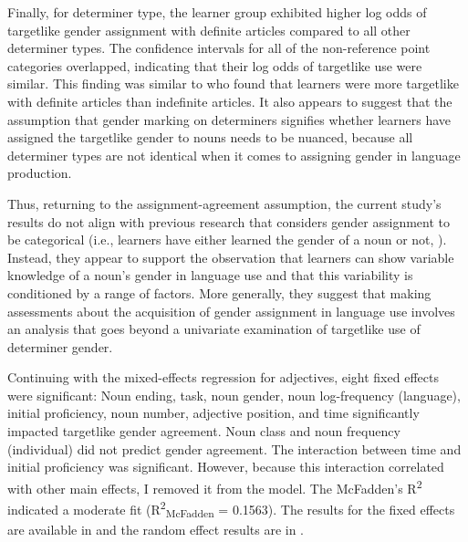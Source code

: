 \documentclass[output=paper,colorlinks,citecolor=brown,modfonts,nonflat]{../langscibook}
\begin{document}
Finally, for determiner type, the learner group exhibited higher log odds of targetlike gender assignment with definite articles compared to all other determiner types. The confidence intervals for all of the non-reference point categories overlapped, indicating that their log odds of targetlike use were similar. This finding was similar to \citet{GaravitoWhite2002} who found that learners were more targetlike with definite articles than indefinite articles. It also appears to suggest that the assumption that gender marking on determiners signifies whether learners have assigned the targetlike gender to nouns needs to be nuanced, because all determiner types are not identical when it comes to assigning gender in language production.



Thus, returning to the assignment-agreement assumption, the current study’s results do not align with previous research that considers gender assignment to be categorical (i.e., learners have either learned the gender of a noun or not, \citealt{Alarcón2010}). Instead, they appear to support the observation that learners can show variable knowledge of a noun’s gender in language use and that this variability is conditioned by a range of factors. More generally, they suggest that making assessments about the acquisition of gender assignment in language use involves an analysis that goes beyond a univariate examination of targetlike use of determiner gender.


Continuing with the mixed-effects regression for adjectives, eight fixed effects were significant: Noun ending, task, noun gender, noun log-frequency (language), initial proficiency, noun number, adjective position, and time significantly impacted targetlike gender agreement. Noun class and noun frequency (individual) did not predict gender agreement. The interaction between time and initial proficiency was significant. However, because this interaction correlated with other main effects, I removed it from the model.  The McFadden’s R\textsuperscript{2} indicated a moderate fit (R\textsuperscript{2}\textsubscript{McFadden} = 0.1563). The results for the fixed effects are available in  and the random effect results are in .
\end{document}
